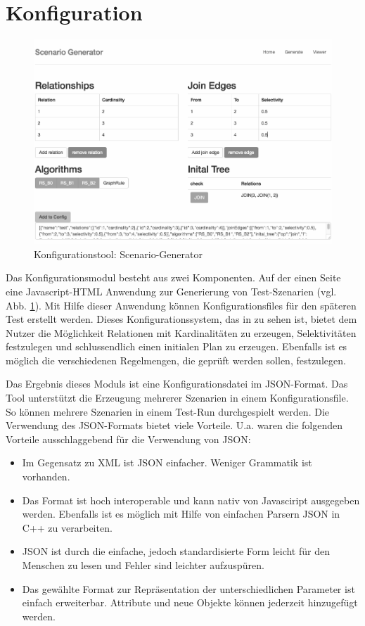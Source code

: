 \section{Konfiguration}


\begin{figure}[ht]
  \centering
  \includegraphics[width=1\textwidth]{04_Implementierung/00_media/Tool.png}
  \caption{Konfigurationstool: Scenario-Generator}
  \label{ScenarioGenerator}
\end{figure}

Das Konfigurationsmodul besteht aus zwei Komponenten. Auf der einen Seite eine Javascript-HTML Anwendung zur Generierung von Test-Szenarien (vgl. Abb. \ref{ScenarioGenerator}). Mit Hilfe dieser Anwendung können Konfigurationsfiles für den späteren Test erstellt werden. Dieses Konfigurationssystem, das in  zu sehen ist, bietet dem Nutzer die Möglichkeit Relationen mit Kardinalitäten zu erzeugen, Selektivitäten festzulegen und schlussendlich einen initialen Plan zu erzeugen. Ebenfalls ist es möglich die verschiedenen Regelmengen, die geprüft werden sollen, festzulegen.

Das Ergebnis dieses Moduls ist eine Konfigurationsdatei im JSON-Format. Das Tool unterstützt die Erzeugung mehrerer Szenarien in einem Konfigurationsfile. So können mehrere Szenarien in einem Test-Run durchgespielt werden. Die Verwendung des JSON-Formats bietet viele Vorteile. U.a. waren die folgenden Vorteile ausschlaggebend für die Verwendung von JSON:

\begin{itemize}
\item Im Gegensatz zu XML ist JSON einfacher. Weniger Grammatik ist vorhanden.
\item Das Format ist hoch interoperable und kann nativ von Javasciript ausgegeben werden. Ebenfalls ist es möglich mit Hilfe von einfachen Parsern JSON in C++ zu verarbeiten.
\item JSON ist durch die einfache, jedoch standardisierte Form leicht für den Menschen zu lesen und Fehler sind leichter aufzuspüren.
\item Das gewählte Format zur Repräsentation der unterschiedlichen Parameter ist einfach erweiterbar. Attribute und neue Objekte können jederzeit hinzugefügt werden.
\end{itemize}

